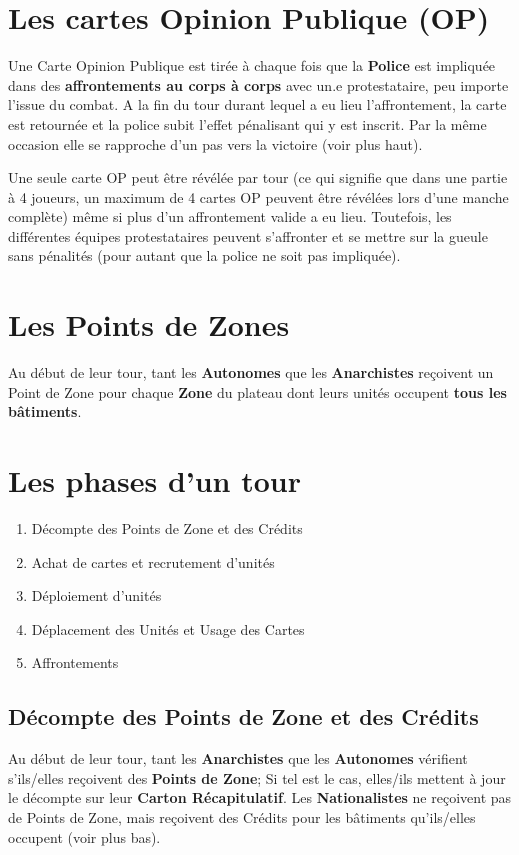 \documentclass[a4paper,13pt]{scrartcl}
\begin{document}
\section*{Les cartes Opinion Publique (OP)}
Une Carte Opinion Publique est tirée à chaque fois que la \textbf{Police} est impliquée dans des \textbf{affrontements au corps à corps} avec un.e protestataire, peu importe l'issue du combat. A la fin du tour durant lequel a eu lieu l'affrontement, la carte est retournée et la police subit l'effet pénalisant qui y est inscrit. Par la même occasion elle se rapproche d'un pas vers la victoire (voir plus haut).

Une seule carte OP peut être révélée par tour  (ce qui signifie que dans une partie à 4 joueurs, un maximum de 4 cartes OP peuvent être révélées lors d'une manche complète) même si plus d'un affrontement valide a eu lieu. Toutefois, les différentes équipes protestataires peuvent s'affronter et se mettre sur la gueule sans pénalités (pour autant que la police ne soit pas impliquée).

\section*{Les Points de Zones}
Au début de leur tour, tant les \textbf{Autonomes} que les \textbf{Anarchistes} reçoivent un Point de Zone pour chaque \textbf{Zone} du plateau dont leurs unités occupent \textbf{tous les bâtiments}.

\section*{Les phases d'un tour}
\begin{enumerate}
\item Décompte des Points de Zone et des Crédits
\item Achat de cartes et recrutement d'unités
\item Déploiement d'unités
\item Déplacement des Unités et Usage des Cartes
\item Affrontements
\end{enumerate}

\subsection{Décompte des Points de Zone et des Crédits}
Au début de leur tour, tant les \textbf{Anarchistes} que les \textbf{Autonomes} vérifient s'ils/elles reçoivent des \textbf{Points de Zone}; Si tel est le cas, elles/ils mettent à jour le décompte sur leur \textbf{Carton Récapitulatif}. Les \textbf{Nationalistes} ne reçoivent pas de Points de Zone, mais reçoivent des Crédits pour les bâtiments qu'ils/elles occupent (voir plus bas).
\end{document}
